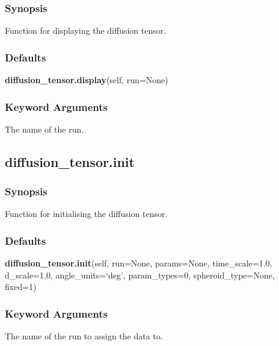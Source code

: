   
 \subsubsection{Synopsis} 

 Function for displaying the diffusion tensor. 
  

  
 \subsubsection{Defaults} 

 \textsf{\textbf{diffusion\_tensor.display}(self, run=None)} 

  
 \subsubsection{Keyword Arguments} 

   The name of the run.  

  

  

 \newpage 

 \subsection{diffusion\_tensor.init} 

  
 \subsubsection{Synopsis} 

 Function for initialising the diffusion tensor. 
  

  
 \subsubsection{Defaults} 

 \textsf{\textbf{diffusion\_tensor.init}(self, run=None, params=None, time\_scale=1.0, d\_scale=1.0, angle\_units=`deg', param\_types=0, spheroid\_type=None, fixed=1)} 

  
 \subsubsection{Keyword Arguments} 

   The name of the run to assign the data to.   


